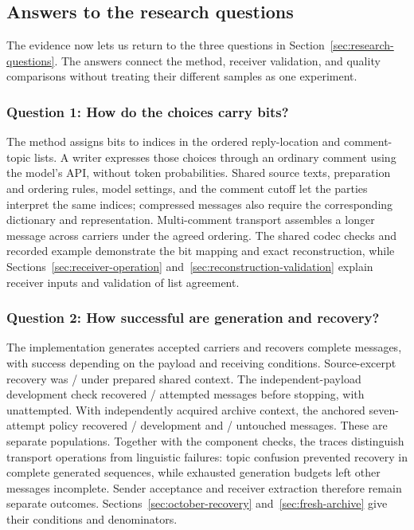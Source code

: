 \subsection{Answers to the research questions}
\label{sec:research-answers}

The evidence now lets us return to the three questions in Section~\ref{sec:research-questions}. The answers connect the method, receiver validation, and quality comparisons without treating their different samples as one experiment.

\subsubsection{Question 1: How do the choices carry bits?}
The method assigns bits to indices in the ordered reply-location and comment-topic lists. A writer expresses those choices through an ordinary comment using the model's API, without token probabilities. Shared source texts, preparation and ordering rules, model settings, and the comment cutoff let the parties interpret the same indices; compressed messages also require the corresponding dictionary and representation. Multi-comment transport assembles a longer message across carriers under the agreed ordering. The shared codec checks and recorded example demonstrate the bit mapping and exact reconstruction, while Sections~\ref{sec:receiver-operation} and~\ref{sec:reconstruction-validation} explain receiver inputs and validation of list agreement.

\subsubsection{Question 2: How successful are generation and recovery?}
The implementation generates accepted carriers and recovers complete messages, with success depending on the payload and receiving conditions. Source-excerpt recovery was \OctExact/\OctAttempts{} under prepared shared context. The independent-payload development check recovered \DevExact/\DevAttempted{} attempted messages before stopping, with \DevUnattempted{} unattempted. With independently acquired archive context, the anchored seven-attempt policy recovered \FreshDevSevenExact/\FreshAssigned{} development and \FreshHeldSevenExact/\FreshAssigned{} untouched messages. These are separate populations. Together with the component checks, the traces distinguish transport operations from linguistic failures: topic confusion prevented recovery in complete generated sequences, while exhausted generation budgets left other messages incomplete. Sender acceptance and receiver extraction therefore remain separate outcomes. Sections~\ref{sec:october-recovery} and~\ref{sec:fresh-archive} give their conditions and denominators.

